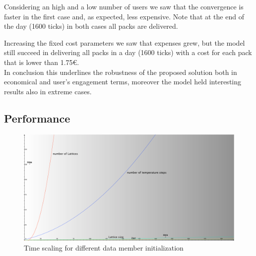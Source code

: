 \documentclass[11pt,a4paper]{article}
\begin{document}
\newpage
Considering an high and a low number of users we saw that the convergence is faster in the first case and, as expected, less expensive. Note that at the end of the day (1600 ticks) in both cases all packs are delivered.


Increasing the fixed cost parameters we saw that expenses grew, but the model still succeed in delivering all packs in a day (1600 ticks) with a cost for each pack that is lower than 1.75\euro{}.
\\
In conclusion this underlines the robustness of the proposed solution both in economical and user's engagement terms, moreover the model held interesting results also in extreme cases.

\subsection*{Performance}
\begin{figure}[h!]
  \centering
   \includegraphics[width=\columnwidth]{img/Andamenti_performance.pdf} 
  \caption{Time scaling for different data member initialization}

\end{figure}
\end{document}
